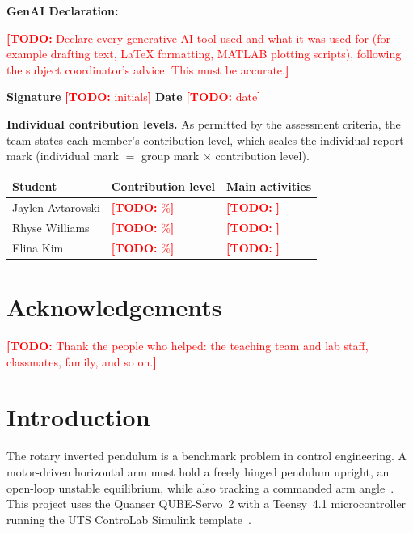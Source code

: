 \documentclass[11pt,a4paper]{article}
\newcommand{\todo}[1]{\textcolor{red}{\textbf{[TODO:} #1\textbf{]}}}
\begin{document}
{\begin{minipage}{\dimexpr\textwidth-2\fboxsep-2\fboxrule\relax}
\vspace{6pt}
\textbf{GenAI Declaration:}\par
\todo{Declare every generative-AI tool used and what it was used for
(for example drafting text, LaTeX formatting, MATLAB plotting scripts),
following the subject coordinator's advice. This must be accurate.}\par

\vspace{10pt}
\textbf{Signature} \quad \todo{initials} \hfill \textbf{Date} \todo{date}\par
\vspace{4pt}
\end{minipage}}

\vspace{12pt}
\textbf{Individual contribution levels.} As permitted by the assessment
criteria, the team states each member's contribution level, which scales
the individual report mark (individual mark $=$ group mark $\times$
contribution level).
\begin{table}[H]\centering
\begin{tabular}{lll}
\toprule
\textbf{Student}&\textbf{Contribution level}&\textbf{Main activities}\\
\midrule
Jaylen Avtarovski&\todo{\%}&\todo{}\\
Rhyse Williams&\todo{\%}&\todo{}\\
Elina Kim&\todo{\%}&\todo{}\\
\bottomrule
\end{tabular}
\end{table}

\clearpage
\tableofcontents
\clearpage

\section*{Acknowledgements}
\todo{Thank the people who helped: the teaching team and lab staff,
classmates, family, and so on.}

\section{Introduction}
The rotary inverted pendulum is a benchmark problem in control
engineering. A motor-driven horizontal arm must hold a freely hinged
pendulum upright, an open-loop unstable equilibrium, while also tracking a
commanded arm angle~\cite{furuta1992,astrom2000}. This project uses the
Quanser QUBE-Servo~2 with a Teensy~4.1 microcontroller running the
UTS ControLab Simulink template~\cite{qube_manual,hardware_template}.
\end{document}

